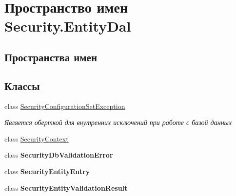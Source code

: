 \hypertarget{namespace_security_1_1_entity_dal}{}\section{Пространство имен Security.\+Entity\+Dal}
\label{namespace_security_1_1_entity_dal}
\subsection*{Пространства имен}
\begin{DoxyCompactItemize}
\end{DoxyCompactItemize}
\subsection*{Классы}
\begin{DoxyCompactItemize}
\item 
class \hyperlink{class_security_1_1_entity_dal_1_1_security_configuration_set_exception}{Security\+Configuration\+Set\+Exception}
\begin{DoxyCompactList}\small\item\em Является оберткой для внутренних исключений при работе с базой данных \end{DoxyCompactList}\item 
class \hyperlink{class_security_1_1_entity_dal_1_1_security_context}{Security\+Context}
\item 
class {\bfseries Security\+Db\+Validation\+Error}
\item 
class {\bfseries Security\+Entity\+Entry}
\item 
class {\bfseries Security\+Entity\+Validation\+Result}
\end{DoxyCompactItemize}
